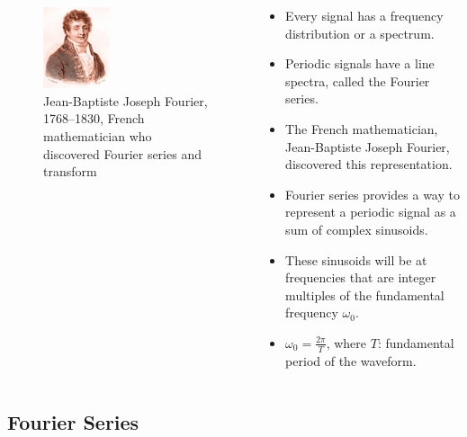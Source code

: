 \begin{frame}
    \begin{columns}[t]
        \begin{column}{0.4\textwidth}
            \begin{figure}
              \centering
              \includegraphics[width=0.4\textwidth]{figures/fourier.jpg}
              \caption{Jean-Baptiste Joseph Fourier, 1768--1830, French mathematician who discovered Fourier series and transform}\label{fi:secb_fourier}
            \end{figure}
        \end{column}
        \begin{column}{0.6\textwidth}
            \begin{itemize}[<+->]
              \item Every signal has a frequency distribution or a \alert{spectrum}.
              \item Periodic signals have a line spectra, called the Fourier series.
              \item The French mathematician, Jean-Baptiste Joseph Fourier, discovered this representation.
              \item Fourier series provides a way  to represent a periodic signal as a sum of complex sinusoids.
              \item These sinusoids will be at frequencies that are integer multiples of the fundamental frequency $\omega_0$.
              \item $\omega_0 = \frac{2\pi}{T}$, where $T$: fundamental period of the waveform.
            \end{itemize}
        \end{column}
    \end{columns}
\end{frame}

\subsection{Fourier Series}

